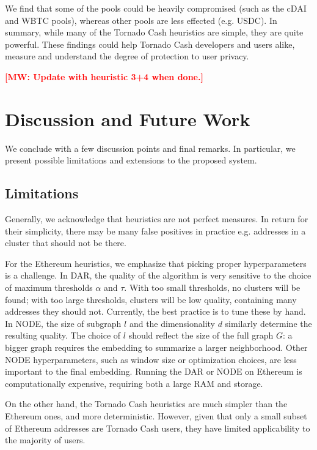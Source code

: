 \documentclass[11pt,a4paper]{article}
\newcommand{\mike}[1]{\textcolor{red}{\bf [MW: #1]}}
\begin{document}
We find that some of the pools could be heavily compromised (such as the cDAI and WBTC pools), whereas other pools are less effected (e.g. USDC). In summary, while many of the Tornado Cash heuristics are simple, they are quite powerful. These findings could help Tornado Cash developers and users alike, measure and understand the degree of protection to user privacy.

\mike{Update with heuristic 3+4 when done.}

\section{Discussion and Future Work}

We conclude with a few discussion points and final remarks. In particular, we present possible limitations and extensions to the proposed system.

\subsection{Limitations}

Generally, we acknowledge that heuristics are not perfect measures. In return for their simplicity, there may be many false positives in practice e.g. addresses in a cluster that should not be there.

For the Ethereum heuristics, we emphasize that picking proper hyperparameters is a challenge. In DAR, the quality of the algorithm is very sensitive to the choice of maximum thresholds $\alpha$ and $\tau$. With too small thresholds, no clusters will be found; with too large thresholds, clusters will be low quality, containing many addresses they should not. Currently, the best practice is to tune these by hand. In NODE, the size of subgraph $l$ and the dimensionality $d$ similarly determine the resulting quality. The choice of $l$ should reflect the size of the full graph $G$: a bigger graph requires the embedding to summarize a larger neighborhood. Other NODE hyperparameters, such as window size or optimization choices, are less important to the final embedding. Running the DAR or NODE on Ethereum is computationally expensive, requiring both a large RAM and storage.

On the other hand, the Tornado Cash heuristics are much simpler than the Ethereum ones, and more deterministic.
However, given that only a small subset of Ethereum addresses are Tornado Cash users, they have limited applicability to the majority of users.
\end{document}
